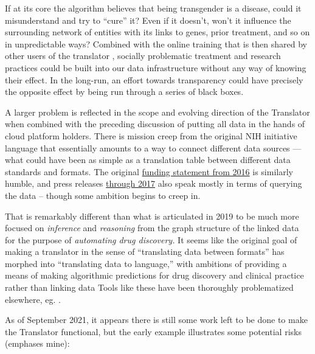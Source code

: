 \documentclass[notoc]{tufte-book}
\begin{document}
If at its core the algorithm believes that being transgender is a
disease, could it misunderstand and try to ``cure'' it? Even if it
doesn't, won't it influence the surrounding network of entities with its
links to genes, prior treatment, and so on in unpredictable ways?
Combined with the online training that is then shared by other users of
the translator \citep{consortiumUniversalBiomedicalData2019} ,
socially problematic treatment and research practices could be built
into our data infrastructure without any way of knowing their effect. In
the long-run, an effort towards transparency could have precisely the
opposite effect by being run through a series of black boxes.

A larger problem is reflected in the scope and evolving direction of the
Translator when combined with the preceding discussion of putting all
data in the hands of cloud platform holders. There is mission creep from
the original NIH initiative language that essentially amounts to a way
to connect different data sources --- what could have been as simple as
a translation table between different data standards and formats. The
original
\href{https://web.archive.org/web/20210709100523/https://ncats.nih.gov/news/releases/2016/feasibility-assessment-translator}{funding
statement from 2016} is similarly humble, and press releases
\href{https://web.archive.org/web/20210709171335/https://ncats.nih.gov/pubs/features/translator}{through
2017} also speak mostly in terms of querying the data -- though some
ambition begins to creep in.

That is remarkably different than what is articulated in 2019 \citep{consortiumUniversalBiomedicalData2019}  to be much more focused on
\emph{inference} and \emph{reasoning} from the graph structure of the
linked data for the purpose of \emph{automating drug discovery.} It
seems like the original goal of making a translator in the sense of
``translating data between formats'' has morphed into ``translating data
to language,'' with ambitions of providing a means of making algorithmic
predictions for drug discovery and clinical practice rather than linking
data \citep{hailuNIHfundedProjectAims2019}  Tools like these have
been thoroughly problematized elsewhere, eg. \citep{groteEthicsAlgorithmicDecisionmaking2020, obermeyerDissectingRacialBias2019, panchArtificialIntelligenceAlgorithmic2019, panchInconvenientTruthAI2019} .

As of September 2021, it appears there is still some work left to be
done to make the Translator functional, but the early example
illustrates some potential risks (emphases mine):
\end{document}
